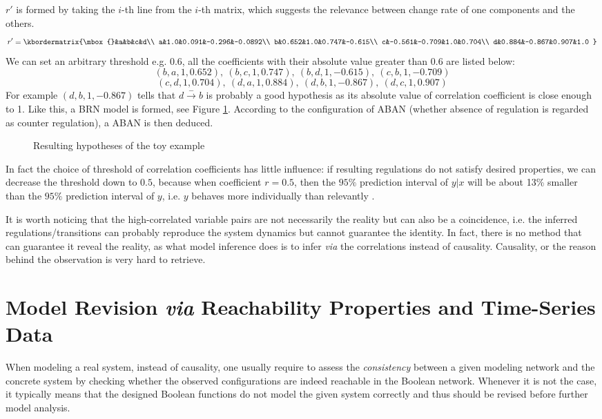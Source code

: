  $r'$ is formed by taking the $i$-th line from the $i$-th matrix, which suggests the relevance between change rate of one components and the others.
$$r'=\kbordermatrix{\mbox{}&a&b&c&d\\
a&1.0&0.091&-0.296&-0.0892\\
b&0.652&1.0&0.747&-0.615\\
c&-0.561&-0.709&1.0&0.704\\
d&0.884&-0.867&0.907&1.0
}$$
We can set an arbitrary threshold e.g. 0.6, all the coefficients with their absolute value greater than 0.6 are listed below:
$$(b,a,1,0.652),\ (b,c,1,0.747),\ (b,d,1,-0.615),\ (c,b,1,-0.709)$$
$$(c,d,1,0.704),\ (d,a,1,0.884),\ (d,b,1,-0.867),\ (d,c,1,0.907)$$
For example $(d,b,1,-0.867)$ tells that $d\xrightarrow{-}b$ is probably a good hypothesis as its absolute value of correlation coefficient is close enough to 1. Like this, a BRN model is formed, see Figure \ref{ResultBRN}. According to the configuration of ABAN (whether absence of regulation is regarded as counter regulation), a ABAN is then deduced.

\begin{figure}[ht]
\centering

\caption{Resulting hypotheses of the toy example}\label{ResultBRN}
\end{figure}

In fact the choice of threshold of correlation coefficients has little influence: if resulting regulations do not satisfy desired properties, we can decrease the threshold down to $0.5$, because when coefficient $r =0.5$, then the $95\%$ prediction interval of $y|x$ will be about 13\% smaller than the $95\%$ prediction interval of $y$, i.e. $y$ behaves more individually than relevantly \cite{hull1927correlation}.

It is worth noticing that the high-correlated variable pairs are not necessarily the reality but can also be a coincidence, i.e. the inferred regulations/transitions can probably reproduce the system dynamics but cannot guarantee the identity.
In fact, there is no method that can guarantee it reveal the reality, as what model inference does is to infer \textit{via} the correlations instead of causality.
Causality, or the reason behind the observation is very hard to retrieve.

\section{Model Revision \textit{via} Reachability Properties and Time-Series Data}
When modeling a real system, instead of causality, one usually require to assess the \textit{consistency} between a given modeling network and the concrete system by checking whether the observed configurations are indeed reachable in the Boolean network.
Whenever it is not the case, it typically means that the designed Boolean functions do not model the given system correctly and thus should be revised before further model analysis.

